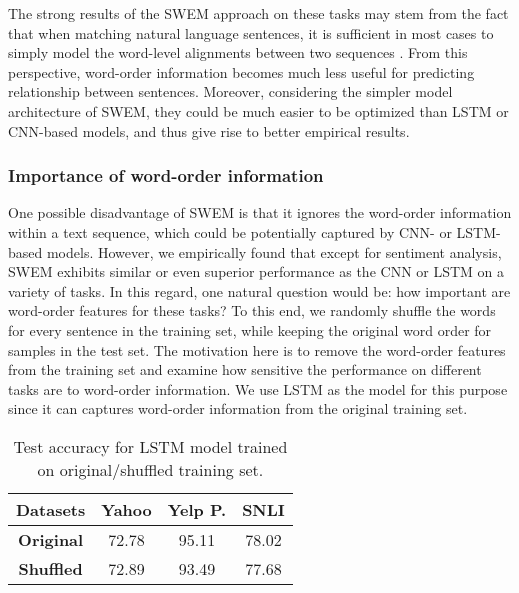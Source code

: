 \documentclass[11pt,a4paper]{article}
\begin{document}
The strong results of the SWEM approach on these tasks may stem from the fact that when matching natural language sentences, it is sufficient in most cases to simply model the word-level alignments between two sequences \citep{parikh2016decomposable}.
From this perspective, word-order information becomes much less useful for predicting relationship between sentences.
Moreover, considering the simpler model architecture of SWEM, they could be much easier to be optimized than LSTM or CNN-based models, and thus give rise to better empirical results.

\subsubsection{Importance of word-order information}\label{important}
One possible disadvantage of SWEM is that it ignores the word-order information within a text sequence, which could be potentially captured by CNN- or LSTM-based models.
However, we empirically found that except for sentiment analysis, SWEM exhibits similar or even superior performance as the CNN or LSTM on a variety of tasks.
In this regard, one natural question would be: how important are word-order features for these tasks?
To this end, we randomly shuffle the words for every sentence in the training set, while keeping the original word order for samples in the test set.
The motivation here is to remove the word-order features from the training set and examine how sensitive the performance on different tasks are to word-order information.
We use LSTM as the model for this purpose since it can captures word-order information from the original training set.

\begin{table} [h!]
	\centering 
	\vspace{-2mm}
	\def\arraystretch{1.2}
	\begin{small}
		\begin{tabular}{c||c|c|c}
\toprule[1.2pt]
			\textbf{Datasets} &  \textbf{Yahoo}  & \textbf{Yelp P.} & \textbf{SNLI} \\
			\hline
			\textbf{Original} & 72.78  & 95.11 & 78.02  \\
\textbf{Shuffled} & 72.89 & 93.49  & 77.68  \\
			\bottomrule[1.2pt]
\end{tabular}
	\end{small}
\caption{Test accuracy for LSTM model trained on original/shuffled training set.}
	\label{tab:order}
	\vspace{-2mm}
\end{table}
\end{document}
